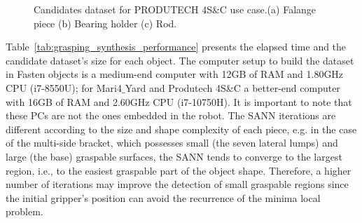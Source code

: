 \begin{figure}[h!]
{\begin{tcolorbox}
\begin{subfigure}[c]{.125\textwidth}
          \caption{}
          \label{fig:rod_candidates}
      \end{subfigure}
     \end{tcolorbox}
     \caption{Candidates dataset for PRODUTECH 4S\&C use case.(a) Falange piece (b) Bearing holder (c) Rod.}
     \label{fig:obj_candiudates_produtech}
   }%
 \end{figure}

Table~\ref{tab:grasping_synthesis_performance} presents the elapsed time and the candidate dataset's size for each object. The computer setup to build the dataset in Fasten objects is a medium-end computer with 12GB of RAM and 1.80GHz CPU (i7-8550U); for Mari4$\_$Yard and Produtech 4S\&C a better-end computer with 16GB of RAM and 2.60GHz CPU (i7-10750H). It is important to note that these PCs are not the ones embedded in the robot. The \ac{SANN} iterations are different according to the size and shape complexity of each piece, e.g. in the case of the multi-side bracket, which possesses small (the seven lateral lumps) and large (the base) graspable surfaces, the \ac{SANN} tends to converge to the largest region, i.e., to the easiest graspable part of the object shape. Therefore, a higher number of iterations may improve the detection of small graspable regions since the initial gripper's position can avoid the recurrence of the minima local problem.

